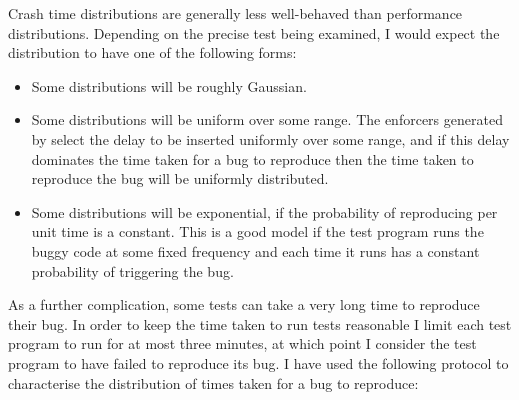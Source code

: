 
Crash time distributions are generally less well-behaved than
performance distributions.  Depending on the precise test being examined, I would expect the distribution
to have one of the following forms:

\begin{itemize}
\item
  Some distributions will be roughly Gaussian.
\item
  Some distributions will be uniform over some range.  The enforcers
  generated by {\technique} select the delay to be inserted uniformly
  over some range, and if this delay dominates the time taken for
  a bug to reproduce then the time taken to reproduce the bug will be
  uniformly distributed.
\item
  Some distributions will be exponential, if the probability of
  reproducing per unit time is a constant.  This is a good model if
  the test program runs the buggy code at some fixed frequency and
  each time it runs has a constant probability of triggering the bug.
\end{itemize}
 
As a further complication, some tests can take a very long time to
reproduce their bug.  In order to keep the time taken to run tests
reasonable I limit each test program to run for at most three minutes,
at which point I consider the test program to have failed to reproduce
its bug.  I have used the following protocol to characterise the
distribution of times taken for a bug to reproduce:

